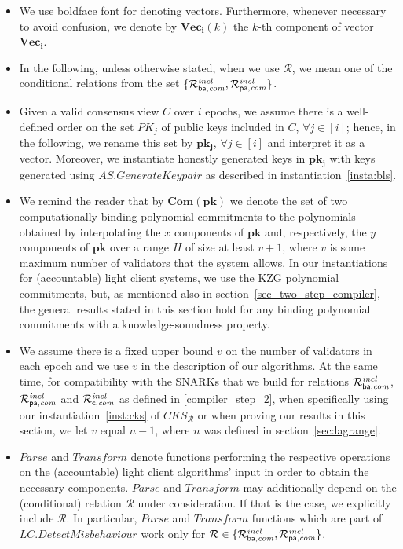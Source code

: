 \begin{itemize}
\item We use boldface font for denoting vectors. Furthermore, whenever necessary to avoid confusion, 
we denote by $\mathbf{Vec_i}(k)$ the $k$-th component of vector $\mathbf{Vec_i}$. 

\item In the following, unless otherwise stated, when we use $\mathcal{R}$, we mean one of the conditional relations from the set 
$\{ \mathcal{R}^{\mathit{incl}}_{\mathsf{ba},\mathit{com}}, \mathcal{R}^{\mathit{incl}}_{\mathsf{pa},\mathit{com}}\}$.%

\item Given a valid consensus view $C$ over $i$ epochs, we assume there is a well-defined order on the set $\mathit{PK_j}$  
of public keys included in $C$, $\forall j \in [i]$; hence, in the following, we rename this set by $\mathbf{pk_j}$, $\forall j \in [i]$ 
and interpret it as a vector. Moreover, we instantiate honestly generated keys in $\mathbf{pk_j}$ with keys generated using 
$\mathit{AS.GenerateKeypair}$ as described in instantiation~\ref{insta:bls}.
  
\item We remind the reader that by $\mathbf{Com}(\mathbf{pk})$ we denote the set of two computationally binding polynomial 
commitments to the polynomials obtained by interpolating the $x$ components of $\mathbf{pk}$ and, respectively, the $y$ 
components of $\mathbf{pk}$ over a range $H$ of size at least $v+1$, where $v$ is some maximum number of validators that the system allows. 
In our instantiations for (accountable) light client systems, we use the KZG polynomial commitments, but, as mentioned also in 
section~\ref{sec_two_step_compiler}, the general results stated in this section hold for any binding polynomial commitments with a knowledge-soundness property.

\item We assume there is a fixed upper bound $v$ on the number of validators in each epoch and we use $v$ in the description of our algorithms. 
At the same time, for compatibility with the SNARKs that we build for relations $\mathcal{R}^{\mathit{incl}}_{\mathsf{ba},\mathit{com}}$, $\mathcal{R}^{\mathit{incl}}_{\mathsf{pa},\mathit{com}}$ and $\mathcal{R}^{\mathit{incl}}_{\mathsf{c},\mathit{com}}$ as defined 
in \ref{compiler_step_2}, when specifically using our instantiation~\ref{inst:cks} of $\mathit{CKS_{\mathcal{R}}}$ or when proving our results in this section, we 
let $v$ equal $n-1$, where $n$ was defined in section~\ref{sec:lagrange}. 

\item $\mathit{Parse}$ and $\mathit{Transform}$ denote functions performing the respective operations on the 
(accountable) light client algorithms' input in order to obtain the necessary components. $\mathit{Parse}$ and $\mathit{Transform}$ 
may additionally depend on the (conditional) relation $\mathcal{R}$ under consideration. If that is the case, we explicitly include 
$\mathcal{R}$. In particular, $\mathit{Parse}$ and $\mathit{Transform}$ functions which are part of $\mathit{LC.DetectMisbehaviour}$ 
work only for $\mathcal{R} \in \{ \mathcal{R}^{\mathit{incl}}_{\mathsf{ba},\mathit{com}}, \mathcal{R}^{\mathit{incl}}_{\mathsf{pa},\mathit{com}} \}$. 


\end{itemize}
